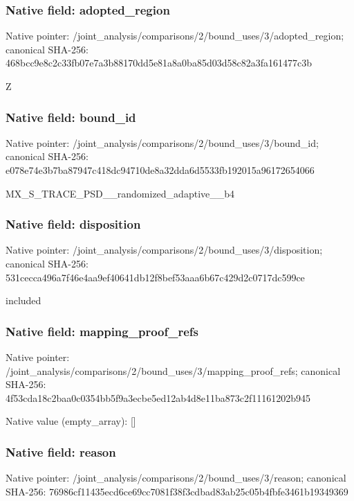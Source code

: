\documentclass[10pt,a4paper]{article}
\begin{document}
\subsubsection{Native field: adopted\_\allowbreak{}region}
Native pointer: /joint\_\allowbreak{}analysis/comparisons/2/bound\_\allowbreak{}uses/3/adopted\_\allowbreak{}region; canonical SHA-256: 468bcc9e8c2c33fb07e7a3b88170dd5e81a8a0ba85d03d58c82a3fa161477c3b

\begingroup\raggedright\sloppy Z\par\endgroup

\subsubsection{Native field: bound\_\allowbreak{}id}
Native pointer: /joint\_\allowbreak{}analysis/comparisons/2/bound\_\allowbreak{}uses/3/bound\_\allowbreak{}id; canonical SHA-256: e078e74e3b7ba87947c418dc94710de8a32dda6d5533fb192015a96172654066

\begingroup\raggedright\sloppy MX\_\allowbreak{}S\_\allowbreak{}TRACE\_\allowbreak{}PSD\_\allowbreak{}\_\allowbreak{}randomized\_\allowbreak{}adaptive\_\allowbreak{}\_\allowbreak{}b4\par\endgroup

\subsubsection{Native field: disposition}
Native pointer: /joint\_\allowbreak{}analysis/comparisons/2/bound\_\allowbreak{}uses/3/disposition; canonical SHA-256: 531cecca496a7f46e4aa9ef40641db12f8bef53aaa6b67c429d2c0717dc599ce

\begingroup\raggedright\sloppy included\par\endgroup

\subsubsection{Native field: mapping\_\allowbreak{}proof\_\allowbreak{}refs}
Native pointer: /joint\_\allowbreak{}analysis/comparisons/2/bound\_\allowbreak{}uses/3/mapping\_\allowbreak{}proof\_\allowbreak{}refs; canonical SHA-256: 4f53cda18c2baa0c0354bb5f9a3ecbe5ed12ab4d8e11ba873c2f11161202b945

Native value (empty\_\allowbreak{}array): []

\subsubsection{Native field: reason}
Native pointer: /joint\_\allowbreak{}analysis/comparisons/2/bound\_\allowbreak{}uses/3/reason; canonical SHA-256: 76986cf11435ecd6ce69cc7081f38f3cdbad83ab25c05b4fbfe3461b19349369
\end{document}
